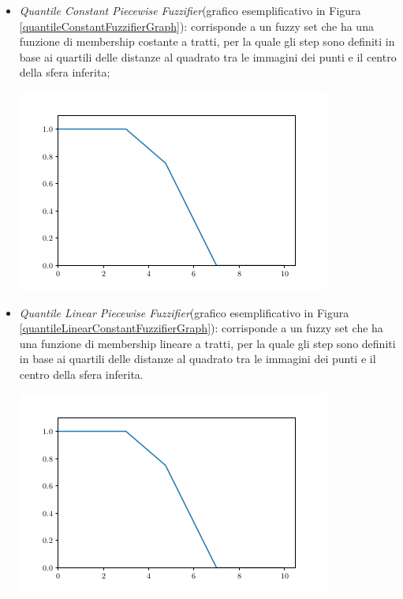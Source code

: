 \documentclass[12pt,a4paper]{report}
\begin{document}
\begin{itemize}
\item \emph{Quantile Constant Piecewise Fuzzifier}(grafico esemplificativo in Figura \ref{quantileConstantFuzzifierGraph}):  corrisponde a un fuzzy set che ha una funzione di membership costante a tratti, per la quale gli step sono definiti in base ai quartili delle distanze al quadrato tra le immagini dei punti e il centro della sfera inferita; 

\begin{minipage}{\linewidth}
	\centering
       \includegraphics[width=0.8\linewidth]{images/quantileConstantPiecewiseFuzzifier.png}
	\label{quantileConstantFuzzifierGraph}
\end{minipage}

\item \emph{Quantile Linear Piecewise Fuzzifier}(grafico esemplificativo in Figura \ref{quantileLinearConstantFuzzifierGraph}):  corrisponde a un fuzzy set che ha una funzione di membership lineare a tratti, per la quale gli step sono definiti in base ai quartili delle distanze al quadrato tra le immagini dei punti e il centro della sfera inferita.

\begin{minipage}{\linewidth}
	\centering
       \includegraphics[width=0.8\linewidth]{images/quantileLinearPiecewiseFuzzifier.png}
	\label{quantileLinearConstantFuzzifierGraph}
\end{minipage}

\end{itemize}
\end{document}
